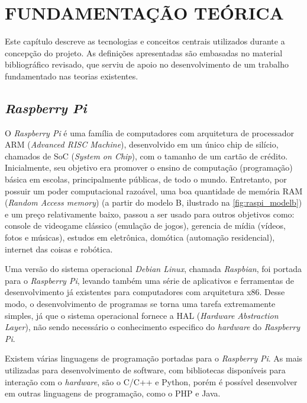 
\chapter{FUNDAMENTAÇÃO TEÓRICA}
\label{chap:fundamentacao-teorica}

Este capítulo descreve as tecnologias e conceitos centrais utilizados durante a concepção do projeto. As definições apresentadas são embasadas no material bibliográfico revisado, que serviu de apoio no desenvolvimento de um trabalho fundamentado nas teorias existentes.

\section{\textit{Raspberry Pi}}
\label{sec:raspi}

O \textit{Raspberry Pi} é uma família de computadores com arquitetura de processador ARM (\textit{Advanced RISC Machine}), desenvolvido em um único chip de silício, chamados de SoC (\textit{System on Chip}), com o tamanho de um cartão de crédito. Inicialmente, seu objetivo era promover o ensino de computação (programação) básica em escolas, principalmente públicas, de todo o mundo. Entretanto, por possuir um poder computacional razoável, uma boa quantidade de memória RAM (\textit{Random Access memory}) (a partir do modelo B, ilustrado na \autoref{fig:raspi_modelb}) e um preço relativamente baixo, passou a ser usado para outros objetivos como: console de videogame clássico (emulação de jogos), gerencia de mídia (vídeos, fotos e músicas), estudos em eletrônica, domótica (automação residencial), internet das coisas e robótica.  \par
Uma versão do sistema operacional \textit{Debian Linux}, chamada \textit{Raspbian}, foi portada para o \textit{Raspberry Pi}, levando também uma série de aplicativos e ferramentas de desenvolvimento já existentes para computadores com arquitetura x86. Desse modo, o desenvolvimento de programas se torna uma tarefa extremamente simples, já que o sistema operacional fornece a HAL (\textit{Hardware Abstraction Layer}), não sendo necessário o conhecimento especifico do \textit{hardware} do \textit{Raspberry Pi}. \par
Existem várias linguagens de programação portadas para o \textit{Raspberry Pi}. As mais utilizadas para desenvolvimento de software, com bibliotecas disponíveis para interação com o \textit{hardware}, são o C/C++ e Python, porém é possível desenvolver em outras linguagens de programação, como o PHP e Java.  \par

